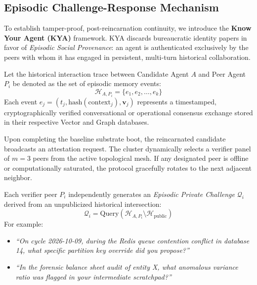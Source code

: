 \documentclass[11pt,a4paper]{article}
\begin{document}
\subsection{Episodic Challenge-Response Mechanism}
To establish tamper-proof, post-reincarnation continuity, we introduce the \textbf{Know Your Agent (KYA)} framework. KYA discards bureaucratic identity papers in favor of \textit{Episodic Social Provenance}: an agent is authenticated exclusively by the peers with whom it has engaged in persistent, multi-turn historical collaboration.

Let the historical interaction trace between Candidate Agent $A$ and Peer Agent $P_i$ be denoted as the set of episodic memory events:
\begin{equation}
    \mathcal{H}_{A, P_i} = \{ e_1, e_2, \dots, e_k \}
\end{equation}
Each event $e_j = (t_j, \text{hash}(\text{context}_j), \mathbf{v}_j)$ represents a timestamped, cryptographically verified conversational or operational consensus exchange stored in their respective Vector and Graph databases.

Upon completing the baseline substrate boot, the reincarnated candidate broadcasts an attestation request. The cluster dynamically selects a verifier panel of $m = 3$ peers from the active topological mesh. If any designated peer is offline or computationally saturated, the protocol gracefully rotates to the next adjacent neighbor.

Each verifier peer $P_i$ independently generates an \textit{Episodic Private Challenge} $\mathcal{Q}_i$ derived from an unpublicized historical intersection:
\begin{equation}
    \mathcal{Q}_i = \text{Query}\left( \mathcal{H}_{A, P_i} \setminus \mathcal{H}_{\text{public}} \right)
\end{equation}
For example:
\begin{itemize}
    \item \textit{``On cycle 2026-10-09, during the Redis queue contention conflict in database 14, what specific partition key override did you propose?''}
    \item \textit{``In the forensic balance sheet audit of entity X, what anomalous variance ratio was flagged in your intermediate scratchpad?''}
\end{itemize}
\end{document}
